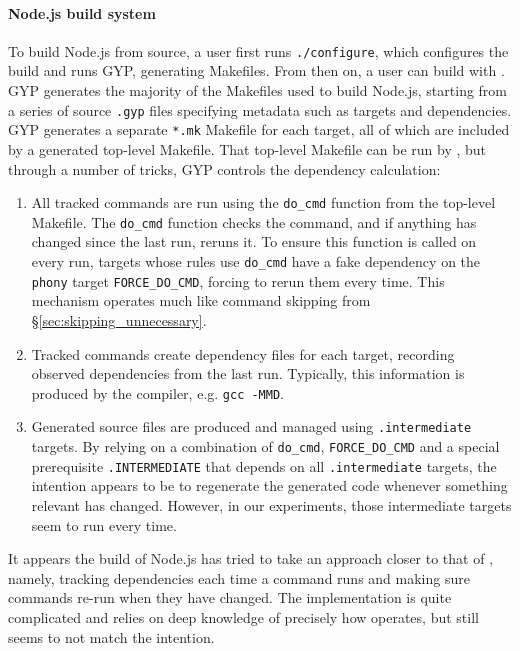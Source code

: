 \paragraph{Node.js build system}

To build Node.js from source, a user first runs \texttt{./configure}, which configures the build and runs GYP, generating Makefiles. From then on, a user can build with \Make. GYP generates the majority of the Makefiles used to build Node.js, starting from a series of source \texttt{.gyp} files specifying metadata such as targets and dependencies. GYP generates a separate \texttt{*.mk} Makefile for each target, all of which are included by a generated top-level Makefile. That top-level Makefile can be run by \Make, but through a number of tricks, GYP  controls  the dependency calculation:

\begin{enumerate}
\item All tracked commands are run using the \texttt{do\_cmd} function from the top-level Makefile. The \texttt{do\_cmd} function checks the command, and if anything has changed since the last run, reruns it. To ensure this function is called on every run, targets whose rules use \texttt{do\_cmd} have a fake dependency on the \texttt{phony} target \texttt{FORCE\_DO\_CMD}, forcing \Make to rerun them every time. This mechanism operates much like \Rattle command skipping from \S\ref{sec:skipping_unnecessary}.
\item Tracked commands create dependency files for each target, recording observed dependencies from the last run. Typically, this information is produced by the compiler, e.g. \texttt{gcc -MMD}.
\item Generated source files are produced and managed using \texttt{.intermediate} targets. By relying on a combination of \texttt{do\_cmd}, \texttt{FORCE\_DO\_CMD} and a special prerequisite \texttt{.INTERMEDIATE} that depends on all \texttt{.intermediate} targets, the intention appears to be to regenerate the generated code whenever something relevant has changed. However, in our experiments, those intermediate targets seem to run every time.
\end{enumerate}

It appears the build of Node.js has tried to take an approach closer to that of \Rattle, namely, tracking dependencies each time a command runs and making sure commands re-run when they have changed.  The implementation is quite complicated and relies on deep knowledge of precisely how \Make operates, but still seems to not match the intention.


